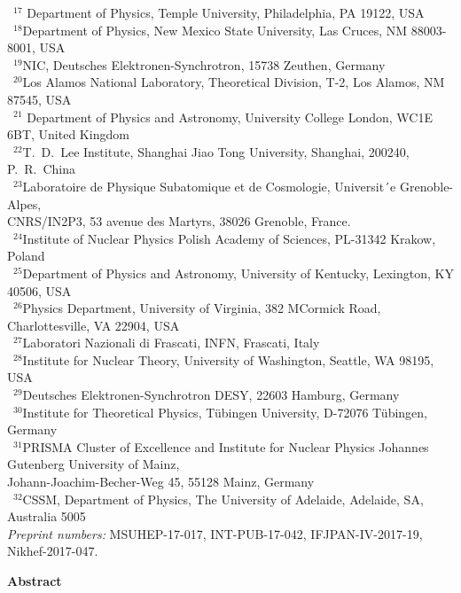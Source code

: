\documentclass[twoside,12pt]{article}
\numberwithin{equation}{section}
\numberwithin{figure}{section}
\numberwithin{table}{section}
\begin{document}
\begin{center}
{~$^{17}$ Department of Physics, 
Temple University, Philadelphia, PA 19122, USA\\
~$^{18}$Department of Physics, 
New Mexico State University, Las Cruces, NM 88003-8001, USA\\
~$^{19}$NIC, Deutsches Elektronen-Synchrotron, 15738 Zeuthen, Germany\\
~$^{20}$Los Alamos National Laboratory, Theoretical Division, 
T-2, Los Alamos, NM 87545, USA\\
~$^{21}$ Department of Physics and Astronomy, 
University College London, WC1E 6BT, United Kingdom\\
~$^{22}$T.~D.~Lee Institute, 
Shanghai Jiao Tong University, Shanghai, 200240, P.~R.~China\\
~$^{23}$Laboratoire de Physique Subatomique et de Cosmologie, 
Universit´e Grenoble-Alpes,\\ 
CNRS/IN2P3, 53 avenue des Martyrs,  38026 Grenoble, France. \\
~$^{24}$Institute of Nuclear Physics Polish Academy of Sciences, 
PL-31342 Krakow, Poland\\
~$^{25}$Department of Physics and Astronomy, University of Kentucky, 
Lexington, KY 40506, USA\\
~$^{26}$Physics Department, University of Virginia, 382 MCormick Road,
Charlottesville, VA 22904, USA\\
~$^{27}$Laboratori Nazionali di Frascati, INFN, Frascati, Italy\\
~$^{28}$Institute for Nuclear Theory, 
University of Washington, Seattle, WA 98195, USA\\
~$^{29}$Deutsches Elektronen-Synchrotron DESY, 22603 Hamburg, Germany\\
~$^{30}$Institute for Theoretical Physics, 
T\"ubingen University, D-72076 T\"ubingen, Germany\\
~$^{31}$PRISMA Cluster of Excellence and Institute for Nuclear Physics 
Johannes Gutenberg University of Mainz,\\ 
Johann-Joachim-Becher-Weg 45, 55128 Mainz, Germany\\
~$^{32}$CSSM, Department of Physics, 
The University of Adelaide, Adelaide, SA, Australia 5005\\
}
\vspace{0.3cm}
       {\it Preprint numbers:} MSUHEP-17-017, INT-PUB-17-042, IFJPAN-IV-2017-19,
       Nikhef-2017-047.



\clearpage


$\quad$\\
\vspace{1.5cm}
{\bf \large Abstract}

\end{center}
\end{document}
